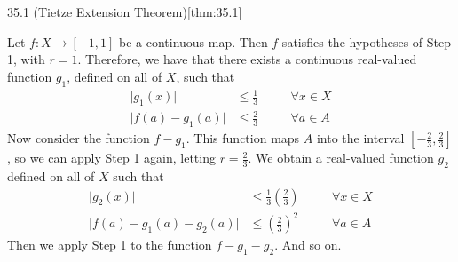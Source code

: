 \begin{thmBox}{35.1 (Tietze Extension Theorem)}[thm:35.1]
\begin{proofBox}
    \baseSkip

    Let \( f: X \rightarrow [ -1, 1 ] \) be a continuous map. 
    Then \( f \) satisfies the hypotheses of Step 1, with \( r = 1 \). 
    Therefore, we have that there exists a continuous real-valued function 
    \( g_{ 1 } \), defined on all of \( X \), such that 
    \begin{equation*}
        \begin{alignedat}{2}
            \lvert g_{ 1 } ( x ) \rvert &\leq \frac{ 1 }{ 3 } 
            &&\quad \forall x \in X
            \\
            \lvert f ( a ) - g_{ 1 } ( a ) \rvert &\leq \frac{ 2 }{ 3 }
            &&\quad \forall a \in A 
        \end{alignedat}
    \end{equation*}
    Now consider the function \( f - g_{ 1 } \). 
    This function maps \( A \) into the interval 
    \( [ -\frac{ 2 }{ 3 }, \frac{ 2 }{ 3 } ] \), so we can apply Step 1 again, 
    letting \( r = \frac{ 2 }{ 3 } \). 
    We obtain a real-valued function \( g_{ 2 } \) defined on all of \( X \)
    such that 
    \begin{equation*}
        \begin{alignedat}{2}
            \lvert g_{ 2 } ( x ) \rvert &\leq 
            \frac{ 1 }{ 3 } \left( \frac{ 2 }{ 3 } \right) 
            &&\quad \forall x \in X
            \\
            \lvert f ( a ) - g_{ 1 } ( a ) - g_{ 2 } ( a ) \rvert 
            &\leq 
            \left( \frac{ 2 }{ 3 } \right)^{ 2 }
            &&\quad \forall a \in A 
        \end{alignedat}
    \end{equation*}
    Then we apply Step 1 to the function \( f - g_{ 1 } - g_{ 2 } \). And so on. 

    \baseSkip 


\end{proofBox}
\end{thmBox}
